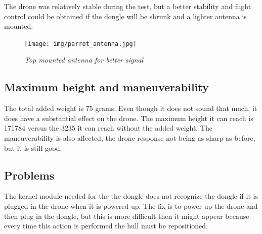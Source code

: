 The drone was relatively stable during the test, but a better stability and flight control could be obtained if the dongle will be shrunk and a lighter antenna is mounted.


\begin{figure}[ht]
\begin{center}
\texttt{[image: img/parrot\_antenna.jpg]}
\end{center}
\caption{\small \itshape{Top mounted antenna for better signal}}
\end{figure}

\subsection{Maximum height and maneuverability}

The total added weight is 75 grams. Even though it does not sound that much, it does have a substantial effect on the drone. The maximum height it can reach is 171784 versus the 3235 it can reach without the added weight. The maneuverability is also affected, the drone response not being as sharp as before, but it is still good.

\subsection{Problems}

The kernel module needed for the the dongle does not recognize the dongle if it is plugged in the drone when it is powered up. The fix is to power up the drone and then plug in the dongle, but this is more difficult then it might appear because every time this action is performed the hull must be repositioned.






\clearpage
 
